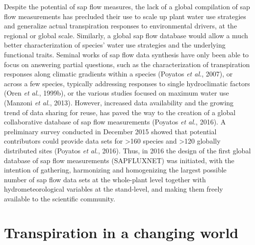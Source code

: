 \documentclass[11pt,twoside]{reedthesis}
\begin{document}
Despite the potential of sap flow measures, the lack of a global
compilation of sap flow measurements has precluded their use to scale up
plant water use strategies and generalize actual transpiration responses
to environmental drivers, at the regional or global scale. Similarly, a
global sap flow database would allow a much better characterization of
species' water use strategies and the underlying functional traits.
Seminal works of sap flow data synthesis have only been able to focus on
answering partial questions, such as the characterization of
transpiration responses along climatic gradients within a species
(Poyatos \emph{et al.}, 2007), or across a few species, typically
addressing responses to single hydroclimatic factors (Oren \emph{et
al.}, 1999b), or the various studies focused on maximum water use
(Manzoni \emph{et al.}, 2013). However, increased data availability and
the growing trend of data sharing for reuse, has paved the way to the
creation of a global collaborative database of sap flow measurements
(Poyatos \emph{et al.}, 2016). A preliminary survey conducted in
December 2015 showed that potential contributors could provide data sets
for \textgreater{}160 species and \textgreater{}120 globally distributed
sites (Poyatos \emph{et al.}, 2016). Thus, in 2016 the design of the
first global database of sap flow measurements (SAPFLUXNET) was
initiated, with the intention of gathering, harmonizing and homogenizing
the largest possible number of sap flow data sets at the whole-plant
level together with hydrometeorological variables at the stand-level,
and making them freely available to the scientific community.\par

\section{Transpiration in a changing
world}\label{transpiration-in-a-changing-world}
\end{document}

